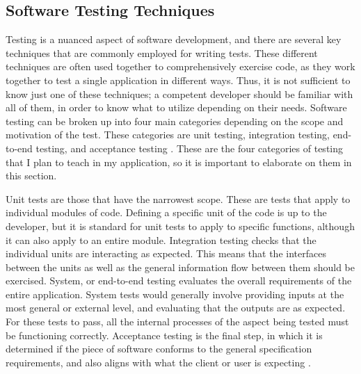 \documentclass[10pt,twocolumn]{article}
\begin{document}
\subsection{Software Testing Techniques}

Testing is a nuanced aspect of software development, and there are several key techniques that are commonly employed for 
writing tests. These different techniques are often used together to comprehensively exercise code, as they work 
together to test a single application in different ways. Thus, it is not sufficient to know just one of these 
techniques; a competent developer should be familiar with all of them, in order to know what to utilize depending on 
their needs. Software testing can be broken up into four main categories depending on the scope and motivation of the 
test. These categories are unit testing, integration testing, end-to-end testing, and acceptance testing 
\cite{Luo2001Article}. These are the four categories of testing that I plan to teach in my application, so it is 
important to elaborate on them in this section. 

Unit tests are those that have the narrowest 
scope. These are tests that apply to individual modules of code. Defining a specific unit of the code is up to the 
developer, but it is standard for unit tests to apply to specific functions, although it can also apply to an entire 
module. Integration testing checks that the individual units are interacting as expected. This means that the interfaces 
between the units as well as the general information flow between them should be exercised. System, or end-to-end 
testing evaluates the overall requirements of the entire application. System tests would generally involve providing 
inputs at the most general or external level, and evaluating that the outputs are as expected. For these tests to pass, 
all the internal processes of the aspect being tested must be functioning correctly. Acceptance testing is the final 
step, in which it is determined if the piece of software conforms to the general specification requirements, and also 
aligns with what the client or user is expecting \cite{Luo2001Article}. 
\end{document}
